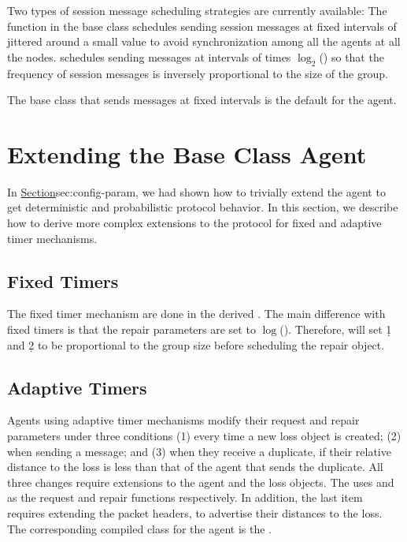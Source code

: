 Two types of session message scheduling strategies are currently
available:
The function in the base class schedules sending session messages at
fixed intervals of  jittered around a small value
to avoid synchronization among all the agents at all the nodes.
 schedules sending messages
at intervals of  times $\log_2$()
so that the frequency of session messages is inversely proportional to 
the size of the group.

The base class that sends messages at fixed intervals
is the default  for the agent.

\section{Extending the Base Class Agent}
\label{sec:extensions}

In
\href{the earlier section on configuration parameters}{Section}{sec:config-param},
we had shown how to trivially extend the agent to
get deterministic and probabilistic protocol behavior.
In this section, we describe how to derive more complex
extensions to the protocol for fixed and adaptive timer mechanisms.

\subsection{Fixed Timers}

The fixed timer mechanism are done in
the derived .
The main difference with fixed timers is that
the repair parameters are set to $\log$().
Therefore, 
will set \d1 and \d2 to be proportional to the group size
before scheduling the repair object.

\subsection{Adaptive Timers}

Agents using adaptive timer mechanisms
modify their request and repair parameters under three conditions
(1) every time a new loss object is created;
(2) when sending a message; and
(3) when they receive a duplicate, if their relative distance to the loss
    is less than that of the agent that sends the duplicate.
All three changes require extensions to the agent and the loss objects.
The 
uses  and
as the request and repair functions respectively.
In addition, the last item requires extending the packet headers,
to advertise their distances to the loss.
The corresponding compiled class for the agent is the
.


